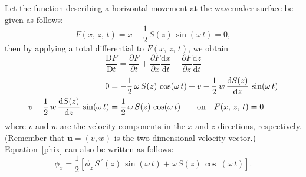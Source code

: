 \documentclass[12pt,a4paper]{report}
\begin{document}
Let the function describing a horizontal movement at the wavemaker surface be given as follows:
\begin{equation}
F(x,\,z,\,t) = x - \frac{1}{2} \, S(z) \, \sin (\omega \, t) = 0,
\end{equation}
then by applying a total differential to $F(x,\,z,\,t)$, we obtain
\begin{equation}
\frac{\mathrm{D}F}{\mathrm{D}t} = \frac{\partial F}{\partial t} + \frac{\partial F}{\partial x} \frac{\mathrm{d}x}{\mathrm{d}t} + \frac{\partial F}{\partial z} \frac{\mathrm{d}z}{\mathrm{d}t} 
\end{equation}
\begin{align}
0 &= -\frac{1}{2} \, \omega \, S(z) \, \cos (\omega \, t) + v - \frac{1}{2} \, w \, \frac{\mathrm{d}S(z)}{\mathrm{d}z} \, \sin (\omega \, t) \\
v - \frac{1}{2} \, w \, \frac{\mathrm{d}S(z)}{\mathrm{d}z} \, \sin (\omega \, t) &= \frac{1}{2} \, \omega \, S(z) \, \cos (\omega \, t) \qquad 
\textmd{on} \quad F(x,\,z,\,t) = 0   \label{phix}
\end{align}
where $v$ and $w$ are the velocity components in the $x$ and $z$ directions, respectively. (Remember that $\mathbf{u} = (v, w)$ is the two-dimensional velocity vector.)
Equation~\eqref{phix} can also be written as follows:
\begin{equation}
\phi_{x} = \frac{1}{2} \left[\phi_{z} \,S\,^{\prime}(z) \, \sin (\omega\, t) + \omega \, S(z) \, \cos \: (\omega\, t) \right].
\end{equation}
\end{document}
